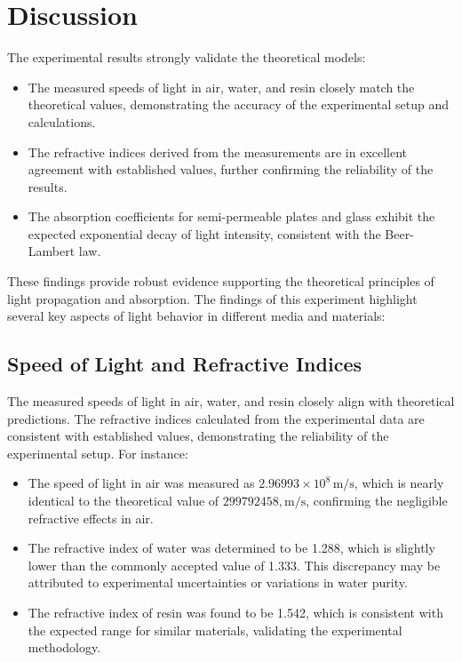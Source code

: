 \documentclass[journal]{IEEEtran}
\begin{document}
\section{Discussion}
The experimental results strongly validate the theoretical models:
\begin{itemize}
    \item The measured speeds of light in air, water, and resin closely match the theoretical values, demonstrating the accuracy of the experimental setup and calculations.
    \item The refractive indices derived from the measurements are in excellent agreement with established values, further confirming the reliability of the results.
    \item The absorption coefficients for semi-permeable plates and glass exhibit the expected exponential decay of light intensity, consistent with the Beer-Lambert law.
\end{itemize}
These findings provide robust evidence supporting the theoretical principles of light propagation and absorption.
The findings of this experiment highlight several key aspects of light behavior in different media and materials:

\subsection{Speed of Light and Refractive Indices}
The measured speeds of light in air, water, and resin closely align with theoretical predictions. The refractive indices calculated from the experimental data are consistent with established values, demonstrating the reliability of the experimental setup. For instance:
\begin{itemize}
    \item The speed of light in air was measured as $2.96993 \times 10^8 \, \text{m/s}$, which is nearly identical to the theoretical value of $299792458, \text{m/s}$, confirming the negligible refractive effects in air.
    \item The refractive index of water was determined to be 1.288, which is slightly lower than the commonly accepted value of 1.333. This discrepancy may be attributed to experimental uncertainties or variations in water purity.
    \item The refractive index of resin was found to be 1.542, which is consistent with the expected range for similar materials, validating the experimental methodology.
\end{itemize}
   
\end{document}
